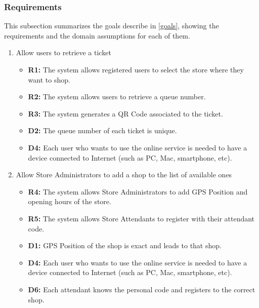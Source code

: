 \documentclass[table, 12pt]{article}
\begin{document}
\begin{flushleft}

    \subsubsection{Requirements}
    This subsection summarizes the goals describe in \ref{goals}, showing the requirements and the domain assumptions for each of them.


    \begin{enumerate}[label=\textbf{-G\arabic*}:]
        \item {Allow users to retrieve a ticket
              \begin{itemize}
                  \item \textbf{R1:} The system allows registered users to select the store where they want to shop.
                  \item \textbf{R2:} The system allows users to retrieve a queue number.
                  \item \textbf{R3:} The system generates a QR Code associated to the ticket.
                  \item \textbf{D2:} The queue number of each ticket is unique.
                  \item \textbf{D4:} Each user who wants to use the online service is needed to have a device connected to Internet (such as PC, Mac, smartphone, etc).
              \end{itemize}
              }
        \item {Allow Store Administrators to add a shop to the list of available ones
              \begin{itemize}
                  \item\textbf{R4:} The system allows Store Administrators to add GPS Position and opening hours of the store.
                  \item \textbf{R5:} The system allows Store Attendants to register with their attendant code.
                  \item \textbf{D1:} GPS Position of the shop is exact and leads to that shop.
                  \item \textbf{D4:} Each user who wants to use the online service is needed to have a device connected to Internet (such as PC, Mac, smartphone, etc).
                  \item \textbf{D6:} Each attendant knows the personal code and registers to the correct shop.
              \end{itemize}
}
\end{enumerate}
\end{flushleft}
\end{document}
